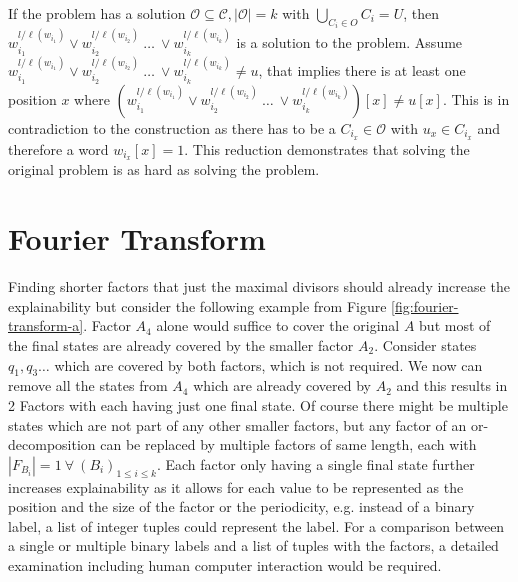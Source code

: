 If the {} problem has a solution $\mathcal{O} \subseteq \mathcal{C}, |\mathcal{O}|=k$ with $\bigcup_{C_i \in O} C_i = U$, then $w_{i_1}^{l / \ell(w_{i_1})} \lor w_{i_2}^{l / \ell(w_{i_2})} ~\dots~ \lor w_{i_k}^{l / \ell(w_{i_k})}$ is a solution to the {} problem. Assume $w_{i_1}^{l / \ell(w_{i_1})} \lor w_{i_2}^{l / \ell(w_{i_2})} ~\dots~ \lor w_{i_k}^{l / \ell(w_{i_k})} \not = u$, that implies there is at least one position $x$ where $(w_{i_1}^{l / \ell(w_{i_1})} \lor w_{i_2}^{l / \ell(w_{i_2})} ~\dots~ \lor w_{i_k}^{l / \ell(w_{i_k})})[x] \not= u[x] $. This is in contradiction to the construction as there has to be a $C_{i_x} \in \mathcal{O}$ with $u_x \in C_{i_x}$ and therefore a word $w_{i_x}[x]=1$. This reduction demonstrates that solving the original problem is as hard as solving the {} problem.


\section{Fourier Transform}
\label{ch:novel-algos:fourier}
Finding shorter factors that just the maximal divisors should already increase the explainability but consider the following example from Figure \ref{fig:fourier-transform-a}. Factor $A_4$ alone would suffice to cover the original \DFA $A$ but most of the final states are already covered by the smaller factor $A_2$. Consider states $q_1, q_3 \dots$ which are covered by both factors, which is not required. We now can remove all the states from $A_4$ which are already covered by $A_2$ and this results in 2 Factors with each having just one final state. Of course there might be multiple states which are not part of any other smaller factors, but any factor of an or-decomposition can be replaced by multiple factors of same length, each with $|F_{B_i}| = 1 ~\forall~ (B_i)_{1 \leq i \leq k}$. Each factor only having a single final state further increases explainability as it allows for each value to be represented as the position and the size of the factor or the periodicity, e.g. instead of a binary label, a list of integer tuples could represent the label. For a comparison between a single or multiple binary labels and a list of tuples with the factors, a detailed examination including human computer interaction would be required.

